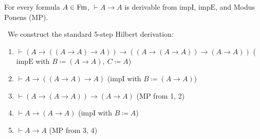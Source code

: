 \documentclass[10pt,a4paper]{article}
\begin{document}
\begin{lemma}\label{lem:id_law}
For every formula $A \in {\textrm{Fm}}$, $\vdash A \to A$ is derivable from $\textrm{impI}$, $\textrm{impE}$, and Modus Ponens ($\textrm{MP}$).
\end{lemma}
\myprf\ We construct the standard 5-step Hilbert derivation:
\begin{enumerate}
\item $\vdash (A \to ((A \to A) \to A)) \to ((A \to (A \to A)) \to (A \to A))$ \hfill ($\textrm{impE}$ with $B \coloneqq (A \to A),\ C \coloneqq A$)
\item $\vdash A \to ((A \to A) \to A)$ \hfill ($\textrm{impI}$ with $B \coloneqq (A \to A)$)
\item $\vdash (A \to (A \to A)) \to (A \to A)$ \hfill ($\textrm{MP}$ from 1, 2)
\item $\vdash A \to (A \to A)$ \hfill ($\textrm{impI}$ with $B \coloneqq A$)
\item $\vdash A \to A$ \hfill ($\textrm{MP}$ from 3, 4)
\end{enumerate}
\myqed
\end{document}
